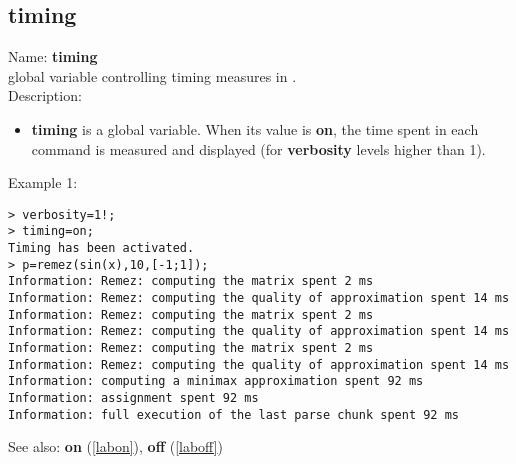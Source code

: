 \subsection{timing}
\label{labtiming}
\noindent Name: \textbf{timing}\\
global variable controlling timing measures in \sollya.\\

\noindent Description: \begin{itemize}

\item \textbf{timing} is a global variable. When its value is \textbf{on}, the time spent in each 
   command is measured and displayed (for \textbf{verbosity} levels higher than 1).
\end{itemize}
\noindent Example 1: 
\begin{center}\begin{minipage}{15cm}\begin{Verbatim}[frame=single]
> verbosity=1!;
> timing=on;
Timing has been activated.
> p=remez(sin(x),10,[-1;1]);
Information: Remez: computing the matrix spent 2 ms
Information: Remez: computing the quality of approximation spent 14 ms
Information: Remez: computing the matrix spent 2 ms
Information: Remez: computing the quality of approximation spent 14 ms
Information: Remez: computing the matrix spent 2 ms
Information: Remez: computing the quality of approximation spent 14 ms
Information: computing a minimax approximation spent 92 ms
Information: assignment spent 92 ms
Information: full execution of the last parse chunk spent 92 ms
\end{Verbatim}
\end{minipage}\end{center}
See also: \textbf{on} (\ref{labon}), \textbf{off} (\ref{laboff})
